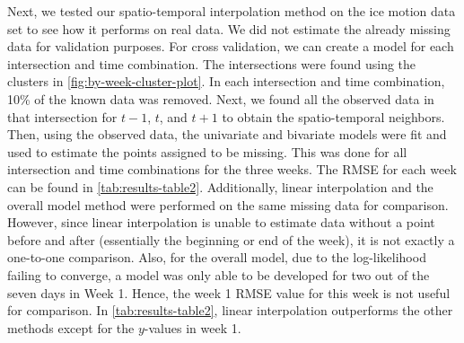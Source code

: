 \documentclass[12pt]{article}
\begin{document}
Next, we tested our spatio-temporal interpolation method on the ice
motion data set to see how it performs on real data. We did not estimate
the already missing data for validation purposes. For cross validation,
we can create a model for each intersection and time combination. The
intersections were found using the clusters in
\cref{fig:by-week-cluster-plot}. In each intersection and time
combination, 10\% of the known data was removed. Next, we found all the
observed data in that intersection for \(t-1\), \(t\), and \(t+1\) to
obtain the spatio-temporal neighbors. Then, using the observed data, the
univariate and bivariate models were fit and used to estimate the points
assigned to be missing. This was done for all intersection and time
combinations for the three weeks. The RMSE for each week can be found in
\cref{tab:results-table2}. Additionally, linear interpolation and the
overall model method were performed on the same missing data for
comparison. However, since linear interpolation is unable to estimate
data without a point before and after (essentially the beginning or end
of the week), it is not exactly a one-to-one comparison. Also, for the
overall model, due to the log-likelihood failing to converge, a model
was only able to be developed for two out of the seven days in Week 1.
Hence, the week 1 RMSE value for this week is not useful for comparison.
In \cref{tab:results-table2}, linear interpolation outperforms the other
methods except for the \(y\)-values in week 1.
\end{document}
